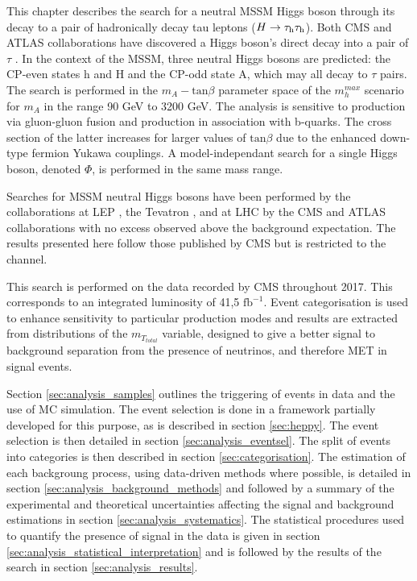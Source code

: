 This chapter describes the search for a neutral MSSM Higgs boson through its decay to a pair of hadronically decay tau leptons ($H \rightarrow \tau_{\rm h}\tau_{\rm h}$). Both CMS and ATLAS collaborations have discovered a Higgs boson's direct decay into a pair of $\tau$ \cite{ATLASHtt,CMSHtt}. In the context of the MSSM, three neutral Higgs bosons are predicted: the CP-even states h and H and the CP-odd state A, which may all decay to $\tau$ pairs. The search is performed in the $m_A - \mathrm{tan}\beta$ parameter space of the $m_{h}^{max}$ scenario \cite{Carena2003} for $m_A$ in the range 90 GeV to 3200 GeV. The analysis is sensitive to production via gluon-gluon fusion and production in association with b-quarks. The cross section of the latter increases for larger values of $\mathrm{tan}\beta$ due to the enhanced down-type fermion Yukawa couplings. A model-independant search for a single Higgs boson, denoted $\Phi$, is performed in the same mass range.

Searches for MSSM neutral Higgs bosons have been performed by the collaborations at LEP \cite{Schael2006}, the Tevatron \cite{Benjamin:2010xb}, and at LHC by the CMS and ATLAS collaborations \cite{Aaboud2018,Sirunyan2018} with no excess observed above the background expectation. The results presented here follow those published by CMS but is restricted to the \tauh\tauh channel.

This search is performed on the data recorded by CMS throughout 2017. This corresponds to an integrated luminosity of 41,5 $\mathrm{fb^{-1}}$. Event categorisation is used to enhance sensitivity to particular production modes and results are extracted from distributions of the $m_{T_{total}}$ variable, designed to give a better signal to background separation from the presence of neutrinos, and therefore MET in signal events.

Section \ref{sec:analysis_samples} outlines the triggering of events in data and the use of MC simulation. The event selection is done in a framework partially developed for this purpose, as is described in section \ref{sec:heppy}. The event selection is then detailed in section \ref{sec:analysis_eventsel}. The split of events into categories is then described in section \ref{sec:categorisation}. The estimation of each backgroung process, using data-driven methods where possible, is detailed in section \ref{sec:analysis_background_methods} and followed by a summary of the experimental and theoretical uncertainties affecting the signal and background estimations in section \ref{sec:analysis_systematics}. The statistical procedures used to quantify the presence of signal in the data is given in section \ref{sec:analysis_statistical_interpretation} and is followed by the results of the search in section \ref{sec:analysis_results}.

